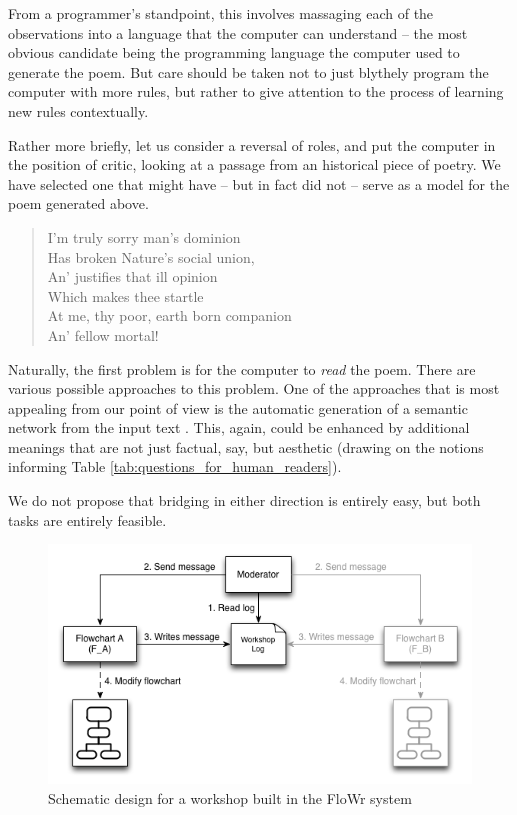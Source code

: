 From a programmer's standpoint, this involves massaging each of the
observations into a language that the computer can understand -- the
most obvious candidate being the programming language the computer
used to generate the poem.  But care should be taken not to just
blythely program the computer with more rules, but rather to give
attention to the process of learning new rules contextually.

Rather more briefly, let us consider a reversal of roles, and put the
computer in the position of critic, looking at a passage from an
historical piece of poetry.  We have selected one that might have --
but in fact did not -- serve as a model for the poem generated above.

{\itshape
\begin{verse}
I'm truly sorry man's dominion\\
Has broken Nature's social union,\\
An' justifies that ill opinion\\
Which makes thee startle\\
At me, thy poor, earth born companion\\
An' fellow mortal!\\
\end{verse}
}

Naturally, the first problem is for the computer to \emph{read} the
poem.  There are various possible approaches to this problem.  One of
the approaches that is most appealing from our point of view is the
automatic generation of a semantic network from the input text
\cite{harrington2007asknet}.  This, again, could be enhanced by
additional meanings that are not just factual, say, but aesthetic
(drawing on the notions informing Table
\ref{tab:questions_for_human_readers}).

We do not propose that bridging in either direction is entirely easy,
but both tasks are entirely feasible.


\begin{figure}
\includegraphics[width=\columnwidth,trim = 0mm 0mm 2mm 0mm,clip=true]{figures/workshop-diagram}
\caption{Schematic design for a workshop built in the FloWr system}
\end{figure}

